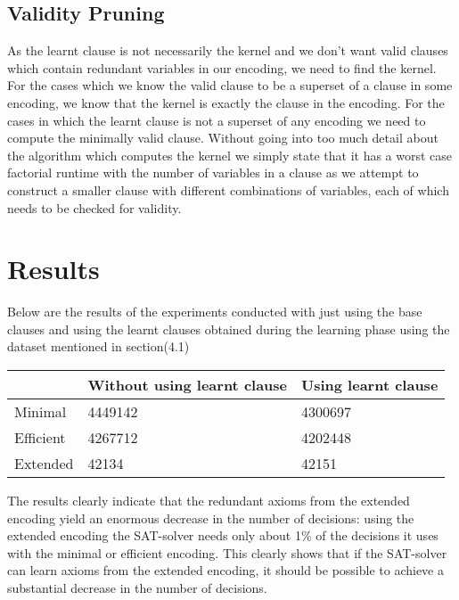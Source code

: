 \documentclass{article}
\begin{document}
\subsection{Validity Pruning} \label{val pruning}
As the learnt clause is not necessarily the kernel and we don't want valid clauses which contain redundant variables in our encoding, we need to find the kernel. For the cases which we know the valid clause to be a superset of a clause in some encoding, we know that the kernel is exactly the clause in the encoding. For the cases in which the learnt clause is not a superset of any encoding we need to compute the minimally valid clause. Without going into too much detail about the algorithm which computes the kernel we simply state that it has a worst case factorial runtime with the number of variables in a clause as we attempt to construct a smaller clause with different combinations of variables, each of which needs to be checked for validity.

\section{Results} \label{results}

Below are the results of the experiments conducted with just using the base clauses and using the learnt clauses obtained during the learning phase using the dataset mentioned in section(4.1)

\begin{center}
 \label{tab:title}
\begin{tabular}{ | l | l | l |}
    \hline
     & Without using learnt clause & Using learnt clause \\ \hline
    Minimal & 4449142 & 4300697 \\ \hline
    Efficient & 4267712 & 4202448 \\ \hline
    Extended & 42134 & 42151 \\
    \hline
\end{tabular}
\end{center}

The results clearly indicate that the redundant axioms from the extended encoding yield an enormous decrease in the number of decisions: using the extended encoding the SAT-solver needs only about 1\% of the decisions it uses with the minimal or efficient encoding. This clearly shows that if the SAT-solver can learn axioms from the extended encoding, it should be possible to achieve a substantial decrease in the number of decisions.
\end{document}
